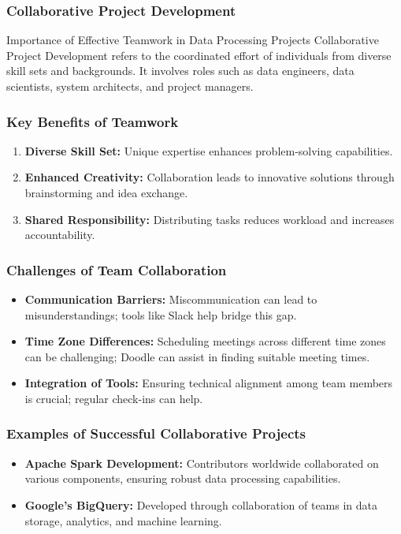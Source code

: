 \documentclass[aspectratio=169]{beamer}
\begin{document}
\begin{frame}[fragile]
    \frametitle{Collaborative Project Development}
    \begin{block}{Importance of Effective Teamwork in Data Processing Projects}
        Collaborative Project Development refers to the coordinated effort of individuals from diverse skill sets and backgrounds. It involves roles such as data engineers, data scientists, system architects, and project managers.
    \end{block}
\end{frame}

\begin{frame}[fragile]
    \frametitle{Key Benefits of Teamwork}
    \begin{enumerate}
        \item \textbf{Diverse Skill Set:} Unique expertise enhances problem-solving capabilities.
        \item \textbf{Enhanced Creativity:} Collaboration leads to innovative solutions through brainstorming and idea exchange.
        \item \textbf{Shared Responsibility:} Distributing tasks reduces workload and increases accountability.
    \end{enumerate}
\end{frame}

\begin{frame}[fragile]
    \frametitle{Challenges of Team Collaboration}
    \begin{itemize}
        \item \textbf{Communication Barriers:} Miscommunication can lead to misunderstandings; tools like Slack help bridge this gap.
        \item \textbf{Time Zone Differences:} Scheduling meetings across different time zones can be challenging; Doodle can assist in finding suitable meeting times.
        \item \textbf{Integration of Tools:} Ensuring technical alignment among team members is crucial; regular check-ins can help.
    \end{itemize}
\end{frame}

\begin{frame}[fragile]
    \frametitle{Examples of Successful Collaborative Projects}
    \begin{itemize}
        \item \textbf{Apache Spark Development:} Contributors worldwide collaborated on various components, ensuring robust data processing capabilities.
        \item \textbf{Google’s BigQuery:} Developed through collaboration of teams in data storage, analytics, and machine learning.
    \end{itemize}
\end{frame}
\end{document}
